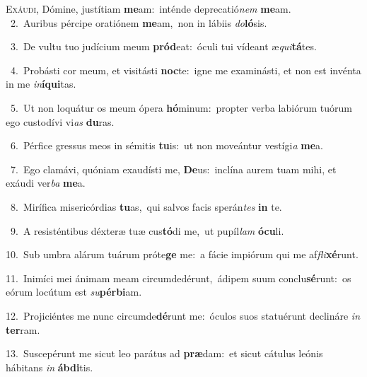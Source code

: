 \lettrine{\initial\textcolor{\initialcolor}{E}}{xáudi,} Dómine, justítiam \textbf{me}\-am:~\star inténde deprecatió\textit{nem} \textbf{me}\-am.\\
{\numbfont\textcolor{\numbcolor}{~2.}}~Auribus pércipe oratiónem \textbf{me}\-am,~\star non in lábiis \textit{do}\-\textbf{ló}sis.\par
{\numbfont\textcolor{\numbcolor}{~3.}}~De vultu tuo judícium meum \textbf{pród}\-eat:~\star óculi tui vídeant æ\-\textit{qui}\-\textbf{tá}tes.\par
{\numbfont\textcolor{\numbcolor}{~4.}}~Probásti cor meum, et visitásti \textbf{noc}\-te:~\star igne me examinásti, et non est invénta in me \textit{in}\-\textbf{í}\textbf{qui}tas.\par
{\numbfont\textcolor{\numbcolor}{~5.}}~Ut non loquátur os meum ópera \textbf{hó}\-minum:~\star propter verba labiórum tuórum ego custodívi vi\textit{as} \textbf{du}\-ras.\par
{\numbfont\textcolor{\numbcolor}{~6.}}~Pérfice gressus meos in sémitis \textbf{tu}\-is:~\star ut non moveántur vestígi\textit{a} \textbf{me}\-a.\par
{\numbfont\textcolor{\numbcolor}{~7.}}~Ego clamávi, quóniam exaudísti me, \textbf{De}\-us:~\star inclína aurem tuam mihi, et exáudi ver\textit{ba} \textbf{me}\-a.\par
{\numbfont\textcolor{\numbcolor}{~8.}}~Mirífica misericórdias \textbf{tu}\-as,~\star qui salvos facis sperán\textit{tes} \textbf{in} te.\par
{\numbfont\textcolor{\numbcolor}{~9.}}~A resisténtibus déxteræ tuæ cus\-\textbf{tó}\-di me,~\star ut pupíl\textit{lam} \textbf{ó}\-\textbf{cu}li.\par
{\numbfont\textcolor{\numbcolor}{10.}}~Sub umbra alárum tuárum próte\textbf{ge} me:~\star a fácie impiórum qui me af\-\textit{fli}\-\textbf{xé}runt.\par
{\numbfont\textcolor{\numbcolor}{11.}}~Inimíci mei ánimam meam circumdedérunt,~\dagger ádipem suum conclu\-\textbf{sé}\-runt:~\star os eórum locútum est \textit{su}\-\textbf{pér}\textbf{bi}am.\par
{\numbfont\textcolor{\numbcolor}{12.}}~Projiciéntes me nunc circumde\-\textbf{dé}\-runt me:~\star óculos suos statuérunt declináre \textit{in} \textbf{ter}\-ram.\par
{\numbfont\textcolor{\numbcolor}{13.}}~Suscepérunt me sicut leo parátus ad \textbf{præ}\-dam:~\star et sicut cátulus leónis hábitans \textit{in} \textbf{áb}\-\textbf{di}tis.\par
